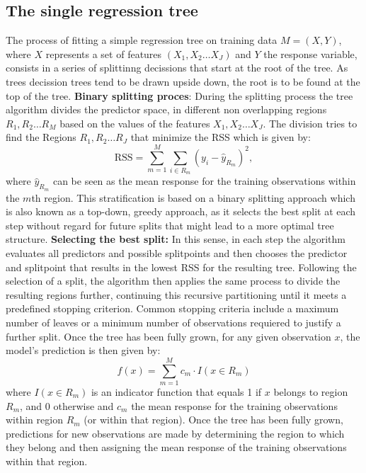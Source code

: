 \documentclass[12pt]{article}
\begin{document}
\subsection{The single regression tree}
The process of fitting a simple regression tree on training data $M=(X,Y)$, where $X$ represents a set of features $(X_1, X_2 \ldots X_J)$ and $Y$ the response variable, consists in a series of splittinng decissions that start at the root of the tree. As trees decission trees tend to be drawn upside down, the root is to be found at the top of the tree. 
\textbf{Binary splitting proces}: During the splitting process the tree algorithm divides the predictor space, in different non overlapping regions $R_1, R_2 \ldots R_M$ based on the values of the features $X_1, X_2 \ldots X_J$. The division tries to find the Regions $R_1, R_2 \ldots R_J$ that minimize the RSS which is given by:
 \[
 \text{RSS} = \sum_{m=1}^{M} \sum_{i \in R_m} (y_i - \hat{y}_{R_m})^2,
 \]
where \(\hat{y}_{R_m}\) can be seen as the mean response for the training observations within the $m$th region. This stratification is based on a binary splitting approach which is also known as a top-down, greedy approach, as it selects the best split at each step without regard for future splits that might lead to a more optimal tree structure.
\textbf{Selecting the best split:} In this sense, in each step the algorithm evaluates all predictors and possible splitpoints and then chooses the predictor and splitpoint that results in the lowest RSS for the resulting tree. Following the selection of a split, the algorithm then applies the same process to divide the resulting regions further, continuing this recursive partitioning until it meets a predefined stopping criterion. Common stopping criteria include  a maximum number of leaves or a minimum number of observations requiered to justify a further split. 
Once the tree has been fully grown, for any given observation \(x\), the model's prediction is then given by:
\[ f(x) = \sum_{m=1}^{M} c_m \cdot I(x \in R_m) \]
where \(I(x \in R_m)\) is an indicator function that equals 1 if \(x\) belongs to region \(R_m\), and 0 otherwise and $c_m$ the mean response for the training observations within region $R_m$ (or within that region).
Once the tree has been fully grown, predictions for new observations are made by determining the region to which they belong and then assigning the mean response of the training observations within that region.
\end{document}
